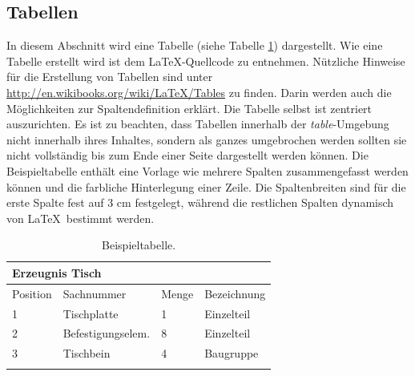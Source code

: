 		\subsection{Tabellen}
		\label{ch_tabellen}
		In diesem Abschnitt wird eine Tabelle (siehe Tabelle \ref{tab:beispiel}) dargestellt. Wie eine Tabelle erstellt wird ist dem \LaTeX-Quellcode zu entnehmen. Nützliche Hinweise für die Erstellung von Tabellen sind unter \url{http://en.wikibooks.org/wiki/LaTeX/Tables} zu finden. Darin werden auch die Möglichkeiten zur Spaltendefinition erklärt. Die Tabelle selbst ist zentriert auszurichten. Es ist zu beachten, dass Tabellen innerhalb der \textit{table}-Umgebung nicht innerhalb ihres Inhaltes, sondern als ganzes umgebrochen werden sollten sie nicht vollständig bis zum Ende einer Seite dargestellt werden können. Die Beispieltabelle enthält eine Vorlage wie mehrere Spalten zusammengefasst werden können und die farbliche Hinterlegung einer Zeile. Die Spaltenbreiten sind für die erste Spalte fest auf 3 cm festgelegt, während die restlichen Spalten dynamisch von \LaTeX \ bestimmt werden.

		\begin{table}[H]	%
			\centering		%
			\begin{tabularx}{\linewidth}{|p{3cm}|X|X|X|}
				\hline %
				\multicolumn{4}{|l|}{Erzeugnis Tisch}\\ \hline
				\hline %
				Position & Sachnummer & Menge & Bezeichnung \\ \hline
				1 &	Tischplatte & 1 & Einzelteil       \\ %
				2 &	Befestigungselem. & 8 & Einzelteil \\ %
				3 &	Tischbein &	4 &	Baugruppe          \\ %
				\hline %
				\caption{Beispieltabelle.} %
				\label{tab:beispiel}
			\end{tabularx}
		\end{table}


